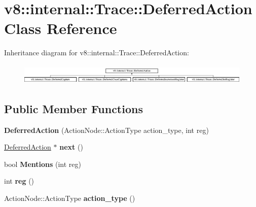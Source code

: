 \hypertarget{classv8_1_1internal_1_1_trace_1_1_deferred_action}{}\section{v8\+:\+:internal\+:\+:Trace\+:\+:Deferred\+Action Class Reference}
\label{classv8_1_1internal_1_1_trace_1_1_deferred_action}
Inheritance diagram for v8\+:\+:internal\+:\+:Trace\+:\+:Deferred\+Action\+:\begin{figure}[H]
\begin{center}
\leavevmode
\includegraphics[height=1.003584cm]{classv8_1_1internal_1_1_trace_1_1_deferred_action}
\end{center}
\end{figure}
\subsection*{Public Member Functions}
\begin{DoxyCompactItemize}
\item 
\hypertarget{classv8_1_1internal_1_1_trace_1_1_deferred_action_a780db5684ee3c089249f0e3a706ec980}{}{\bfseries Deferred\+Action} (Action\+Node\+::\+Action\+Type action\+\_\+type, int reg)\label{classv8_1_1internal_1_1_trace_1_1_deferred_action_a780db5684ee3c089249f0e3a706ec980}

\item 
\hypertarget{classv8_1_1internal_1_1_trace_1_1_deferred_action_acd45c461c5e1ed04f88be43d0c8219bf}{}\hyperlink{classv8_1_1internal_1_1_trace_1_1_deferred_action}{Deferred\+Action} $\ast$ {\bfseries next} ()\label{classv8_1_1internal_1_1_trace_1_1_deferred_action_acd45c461c5e1ed04f88be43d0c8219bf}

\item 
\hypertarget{classv8_1_1internal_1_1_trace_1_1_deferred_action_a21dc8aabaf396310ae95c56477bf55bd}{}bool {\bfseries Mentions} (int reg)\label{classv8_1_1internal_1_1_trace_1_1_deferred_action_a21dc8aabaf396310ae95c56477bf55bd}

\item 
\hypertarget{classv8_1_1internal_1_1_trace_1_1_deferred_action_af1d99354c745bba3171ad4f7f2203246}{}int {\bfseries reg} ()\label{classv8_1_1internal_1_1_trace_1_1_deferred_action_af1d99354c745bba3171ad4f7f2203246}

\item 
\hypertarget{classv8_1_1internal_1_1_trace_1_1_deferred_action_a7b2e8c58b919f2462e71c1e592a37582}{}Action\+Node\+::\+Action\+Type {\bfseries action\+\_\+type} ()\label{classv8_1_1internal_1_1_trace_1_1_deferred_action_a7b2e8c58b919f2462e71c1e592a37582}

\end{DoxyCompactItemize}
